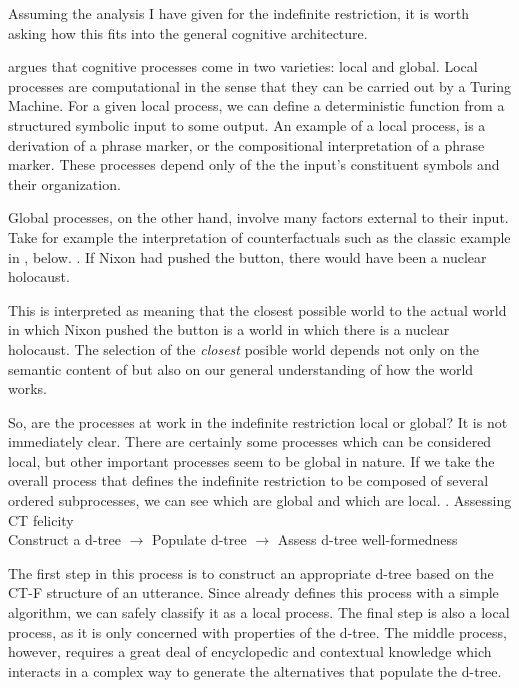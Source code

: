 \documentclass[GPFinal]{subfiles}
\begin{document}
Assuming the analysis I have given for the indefinite restriction, it is worth asking how this fits into the general cognitive architecture.

\textcite{fodor2001mind} argues that cognitive processes come in two varieties: local and global.
Local processes are computational in the sense that they can be carried out by a Turing Machine.
For a given local process, we can define a deterministic function from a structured symbolic input to some output.
An example of a local process, is a derivation of a phrase marker, or the compositional interpretation of a phrase marker.
These processes depend only of the the input's constituent symbols and their organization.

Global processes, on the other hand, involve many factors external to their input.
Take for example the interpretation of counterfactuals such as the classic example in \Next, below.
\ex. If Nixon had pushed the button, there would have been a nuclear holocaust.\hfill <++>

This is interpreted as meaning that the closest possible world to the actual world in which Nixon pushed the button is a world in which there is a nuclear holocaust.
The selection of the \textit{closest} posible world depends not only on the semantic content of \Last but also on our general understanding of how the world works.

So, are the processes at work in the indefinite restriction local or global?
It is not immediately clear.
There are certainly some processes which can be considered local, but other important processes seem to be global in nature.
If we take the overall process that defines the indefinite restriction to be composed of several ordered subprocesses, we can see which are global and which are local.
\ex. Assessing CT felicity\\
Construct a d-tree $\rightarrow$ Populate d-tree $\rightarrow$ Assess d-tree well-formedness

The first step in this process is to construct an appropriate d-tree based on the CT-F structure of an utterance.
Since \textcite{buring2003d} already defines this process with a simple algorithm, we can safely classify it as a local process.
The final step is also a local process, as it is only concerned with properties of the d-tree.
The middle process, however, requires a great deal of encyclopedic and contextual knowledge which interacts in a complex way to generate the alternatives that populate the d-tree.
\end{document}
